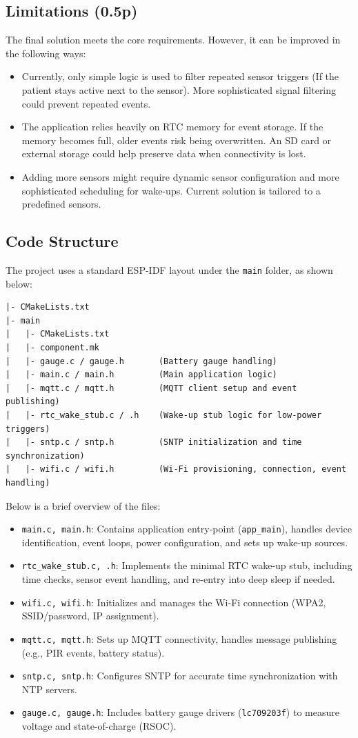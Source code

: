 \documentclass[A4,10pt]{article}
\begin{document}
\subsection{Limitations (0.5p)}

The final solution meets the core requirements. However, it can be improved in the following ways:
\begin{itemize}
    \item Currently, only simple logic is used to filter repeated sensor triggers (If the patient stays active next to the sensor). More sophisticated signal filtering could prevent repeated events.
    \item The application relies heavily on RTC memory for event storage. If the memory becomes full, older events risk being overwritten. An SD card or external storage could help preserve data when connectivity is lost.
    \item Adding more sensors might require dynamic sensor configuration and more sophisticated scheduling for wake-ups. Current solution is tailored to a predefined sensors.
\end{itemize}

\subsection{Code Structure} The project uses a standard ESP-IDF layout under the \texttt{main} folder, as shown below:
\begin{verbatim}
|- CMakeLists.txt
|- main
|   |- CMakeLists.txt
|   |- component.mk
|   |- gauge.c / gauge.h       (Battery gauge handling)
|   |- main.c / main.h         (Main application logic)
|   |- mqtt.c / mqtt.h         (MQTT client setup and event publishing)
|   |- rtc_wake_stub.c / .h    (Wake-up stub logic for low-power triggers)
|   |- sntp.c / sntp.h         (SNTP initialization and time synchronization)
|   |- wifi.c / wifi.h         (Wi-Fi provisioning, connection, event handling)
\end{verbatim}

\noindent Below is a brief overview of the files:
\begin{itemize}
    \item \texttt{main.c, main.h}: Contains application entry-point (\texttt{app\_main}), handles device identification, event loops, power configuration, and sets up wake-up sources.
    \item \texttt{rtc\_wake\_stub.c, .h}: Implements the minimal RTC wake-up stub, including time checks, sensor event handling, and re-entry into deep sleep if needed.
    \item \texttt{wifi.c, wifi.h}: Initializes and manages the Wi-Fi connection (WPA2, SSID/password, IP assignment).
    \item \texttt{mqtt.c, mqtt.h}: Sets up MQTT connectivity, handles message publishing (e.g., PIR events, battery status).
    \item \texttt{sntp.c, sntp.h}: Configures SNTP for accurate time synchronization with NTP servers.
    \item \texttt{gauge.c, gauge.h}: Includes battery gauge drivers (\texttt{lc709203f}) to measure voltage and state-of-charge (RSOC).
\end{itemize}
\end{document}
